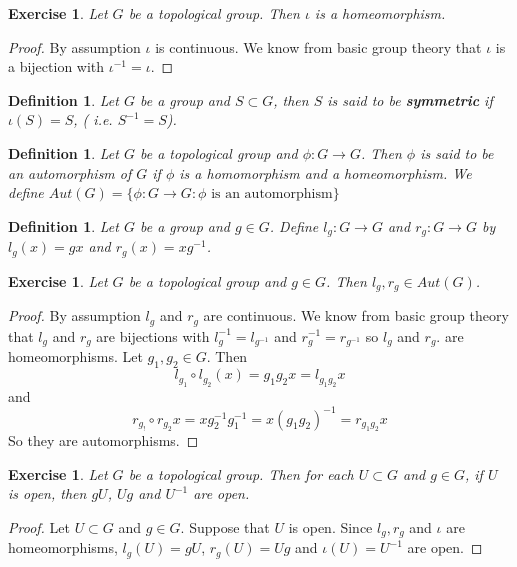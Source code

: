 \documentclass[12pt]{amsart}
\newtheorem{defn}[thm]{Definition}
\newtheorem{ex}[thm]{Exercise}
\begin{document}
	\begin{ex}
		Let $G$ be a topological group. Then $\iota$ is a homeomorphism.
	\end{ex}

	\begin{proof}
		By assumption $\iota$ is continuous. We know from basic group theory that $\iota$ is a bijection with $\iota^{-1} = \iota$. 
	\end{proof}

	\begin{defn}
		Let $G$ be a group and $S \subset G$, then $S$ is said to be \textbf{symmetric} if $\iota(S) = S$, ( i.e. $S^{-1} = S$).
	\end{defn}
	
	\begin{defn}
		Let $G$ be a topological group and $\phi:G \rightarrow G$. Then $\phi$ is said to be an automorphism of $G$ if $\phi$ is a homomorphism and a homeomorphism. We define $Aut(G) = \{\phi:G \rightarrow G: \phi \text{ is an automorphism}\}$
	\end{defn}
	
	\begin{defn}
		Let $G$ be a group and $g \in G$. Define $l_g:G \rightarrow G$ and $r_g:G \rightarrow G$ by $l_g(x) = gx$ and $r_g(x) = xg^{-1}$. 
	\end{defn}
	
	\begin{ex}
		Let $G$ be a topological group and $g \in G$. Then $l_g, r_g \in Aut(G)$.
	\end{ex}
	
	\begin{proof}
		By assumption $l_g$ and $r_g$ are continuous. We know from basic group theory that $l_g$ and $r_g$ are bijections with $l_g^{-1} = l_{g^{-1}}$ and $r_g^{-1} = r_{g^{-1}}$ so $l_g$ and $r_g$. are homeomorphisms. Let $g_1, g_2 \in G$. Then $$l_{g_1} \circ l_{g_2}(x) = g_1 g_2 x = l_{g_1 g_2}x$$ and $$r_{g_!} \circ r_{g_2} x = xg_2^{-1}g_1^{-1} = x(g_1g_2)^{-1} = r_{g_1g_2}x$$ So they are automorphisms. 
	\end{proof}
	
	\begin{ex}
		Let $G$ be a topological group. Then for each $U \subset G$ and $g \in G$, if $U$ is open, then $gU$, $Ug$ and $U^{-1}$ are open. 
	\end{ex}
	\begin{proof}
		Let $U \subset G$ and $g \in G$. Suppose that $U$ is open. Since $l_g, r_g$ and $\iota$ are homeomorphisms, $l_g(U) = gU$, $r_g(U) = Ug$ and $\iota(U) = U^{-1}$ are open. 
	\end{proof}
	
\end{document}
